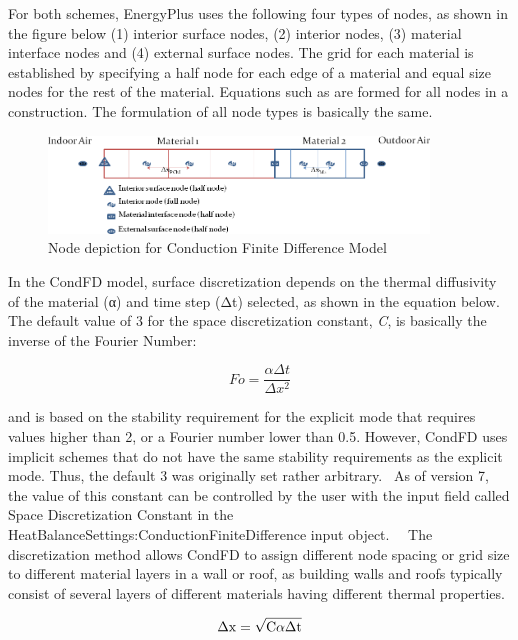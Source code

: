 For both schemes, EnergyPlus uses the following four types of nodes, as shown in the figure below (1) interior surface nodes, (2) interior nodes, (3) material interface nodes and (4) external surface nodes. The grid for each material is established by specifying a half node for each edge of a material and equal size nodes for the rest of the material. Equations such as are formed for all nodes in a construction. The formulation of all node types is basically the same.

\begin{figure}[hbtp] %
\centering
\includegraphics[width=0.9\textwidth, height=0.9\textheight, keepaspectratio=true]{media/image176.png}
\caption{Node depiction for Conduction Finite Difference Model \protect \label{fig:node-depiction-for-conduction-finite}}
\end{figure}

In the CondFD model, surface discretization depends on the thermal diffusivity of the material (α) and time step (Δt) selected, as shown in the equation below. The default value of 3 for the space discretization constant, \emph{C}, is basically the inverse of the Fourier Number:

\begin{equation}
Fo = \frac{\alpha \Delta t}{\Delta x^2}
\end{equation}

and is based on the stability requirement for the explicit mode that requires values higher than 2, or a Fourier number lower than 0.5. However, CondFD uses implicit schemes that do not have the same stability requirements as the explicit mode. Thus, the default 3 was originally set rather arbitrary.~ As of version 7, the value of this constant can be controlled by the user with the input field called Space Discretization Constant in the HeatBalanceSettings:ConductionFiniteDifference input object.~~ The discretization method allows CondFD to assign different node spacing or grid size to different material layers in a wall or roof, as building walls and roofs typically consist of several layers of different materials having different thermal properties.

\begin{equation}
{\rm{\Delta x}} = \sqrt {{\rm{C\alpha \Delta t}}}
\end{equation}


